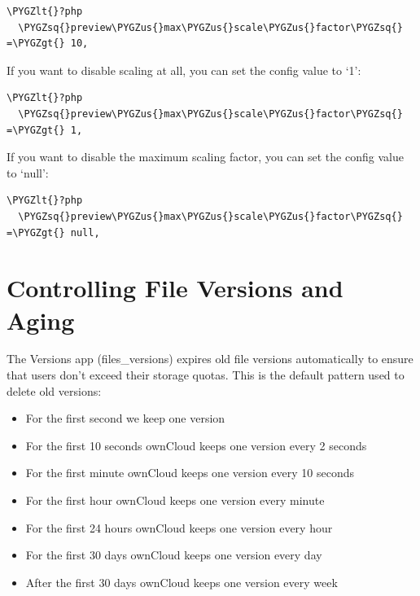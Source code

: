 \documentclass[letterpaper,10pt,english]{sphinxmanual}
\def\PYGZus{\char`\_}
\def\PYGZlt{\char`\<}
\def\PYGZgt{\char`\>}
\def\PYGZsq{\char`\'}
\begin{document}
\begin{Verbatim}[commandchars=\\\{\}]
\PYGZlt{}?php
  \PYGZsq{}preview\PYGZus{}max\PYGZus{}scale\PYGZus{}factor\PYGZsq{} =\PYGZgt{} 10,
\end{Verbatim}

If you want to disable scaling at all, you can set the config value to `1':

\begin{Verbatim}[commandchars=\\\{\}]
\PYGZlt{}?php
  \PYGZsq{}preview\PYGZus{}max\PYGZus{}scale\PYGZus{}factor\PYGZsq{} =\PYGZgt{} 1,
\end{Verbatim}

If you want to disable the maximum scaling factor, you can set the config value
to `null':

\begin{Verbatim}[commandchars=\\\{\}]
\PYGZlt{}?php
  \PYGZsq{}preview\PYGZus{}max\PYGZus{}scale\PYGZus{}factor\PYGZsq{} =\PYGZgt{} null,
\end{Verbatim}


\section{Controlling File Versions and Aging}
\label{configuration_files/file_versioning:controlling-file-versions-and-aging}\label{configuration_files/file_versioning::doc}
The Versions app (files\_versions) expires old file versions automatically to
ensure that users don't exceed their storage quotas. This is the default
pattern used to delete old versions:
\begin{itemize}
\item {} 
For the first second we keep one version

\item {} 
For the first 10 seconds ownCloud keeps one version every 2 seconds

\item {} 
For the first minute ownCloud keeps one version every 10 seconds

\item {} 
For the first hour ownCloud keeps one version every minute

\item {} 
For the first 24 hours ownCloud keeps one version every hour

\item {} 
For the first 30 days ownCloud keeps one version every day

\item {} 
After the first 30 days ownCloud keeps one version every week

\end{itemize}
\end{document}
